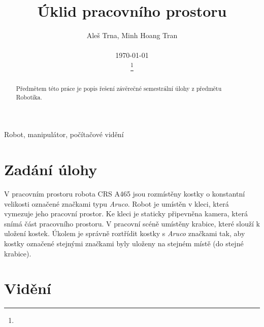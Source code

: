 \documentclass[journal,twoside,web]{ieeecolor}
\begin{document}
\title{Úklid pracovního prostoru}
\author{Aleš Trna, Minh Hoang Tran \\ \begin{center}
        \today
    \end{center}
    \thanks{}}

\maketitle

\begin{abstract}
    Předmětem této práce je popis řešení závěrečné semestrální úlohy z předmětu Robotika.
\end{abstract}

\begin{IEEEkeywords}
    Robot, manipulátor, počítačové vidění
\end{IEEEkeywords}

\section{Zadání úlohy}
V pracovním prostoru robota CRS A465 jsou rozmístěny kostky o konstantní velikosti označené %
značkami typu \textit{Aruco}. Robot je umístěn v kleci, která vymezuje jeho pracovní prostor. %
Ke kleci je staticky připevněna kamera, která snímá část pracovního prostoru. %
V pracovní scéně umístěny krabice, %
které slouží k uložení kostek. Úkolem je správně roztřídit kostky s \textit{Aruco} %
značkami tak, aby kostky označené stejnými značkami byly uloženy na stejném místě (do stejné krabice).

\section{Vidění}
\end{document}
